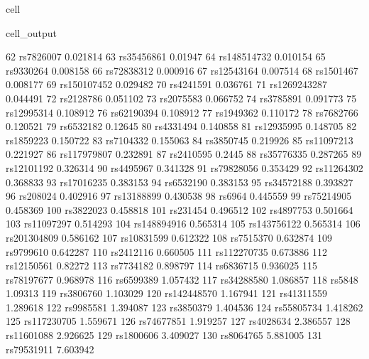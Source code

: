 \documentclass[letterpaper,10pt,english]{jupyterBook}
\begin{document}
\begin{sphinxuseclass}{cell}
\begin{sphinxVerbatimOutput}
\begin{sphinxuseclass}{cell_output}
\begin{sphinxVerbatim}[commandchars=\\\{\}]
62        rs7826007   \PYGZhy{}0.021814
63       rs35456861    \PYGZhy{}0.01947
64      rs148514732   \PYGZhy{}0.010154
65        rs9330264   \PYGZhy{}0.008158
66       rs72838312   \PYGZhy{}0.000916
67       rs12543164    0.007514
68        rs1501467    0.008177
69      rs150107452    0.029482
70        rs4241591    0.036761
71     rs1269243287    0.044491
72        rs2128786    0.051102
73        rs2075583    0.066752
74        rs3785891    0.091773
75       rs12995314    0.108912
76       rs62190394    0.108912
77        rs1949362    0.110172
78        rs7682766    0.120521
79        rs6532182     0.12645
80        rs4331494    0.140858
81       rs12935995    0.148705
82        rs1859223    0.150722
83        rs7104332    0.155063
84        rs3850745    0.219926
85       rs11097213    0.221927
86      rs117979807    0.232891
87        rs2410595      0.2445
88       rs35776335    0.287265
89       rs12101192    0.326314
90        rs4495967    0.341328
91       rs79828056    0.353429
92       rs11264302    0.368833
93       rs17016235    0.383153
94        rs6532190    0.383153
95       rs34572188    0.393827
96         rs208024    0.402916
97       rs13188899    0.430538
98           rs6964    0.445559
99       rs75214905    0.458369
100       rs3822023    0.458818
101        rs231454    0.496512
102       rs4897753    0.501664
103      rs11097297    0.514293
104     rs148894916    0.565314
105     rs143756122    0.565314
106     rs201304809    0.586162
107      rs10831599    0.612322
108       rs7515370    0.632874
109       rs9799610    0.642287
110       rs2412116    0.660505
111     rs112270735    0.673886
112      rs12150561     0.82272
113       rs7734182    0.898797
114       rs6836715    0.936025
115      rs78197677    0.968978
116       rs6599389    1.057432
117      rs34288580    1.086857
118          rs5848     1.09313
119       rs3806760    1.103029
120     rs142448570    1.167941
121      rs41311559    1.289618
122       rs9985581    1.394087
123       rs3850379    1.404536
124      rs55805734    1.418262
125     rs117230705    1.559671
126      rs74677851    1.919257
127       rs4028634    2.386557
128      rs11601088    2.926625
129       rs1800606    3.409027
130       rs8064765    5.881005
131      rs79531911    7.603942
\end{sphinxVerbatim}

\end{sphinxuseclass}\end{sphinxVerbatimOutput}

\end{sphinxuseclass}






\renewcommand{\indexname}{Index}
\printindex
\end{document}
